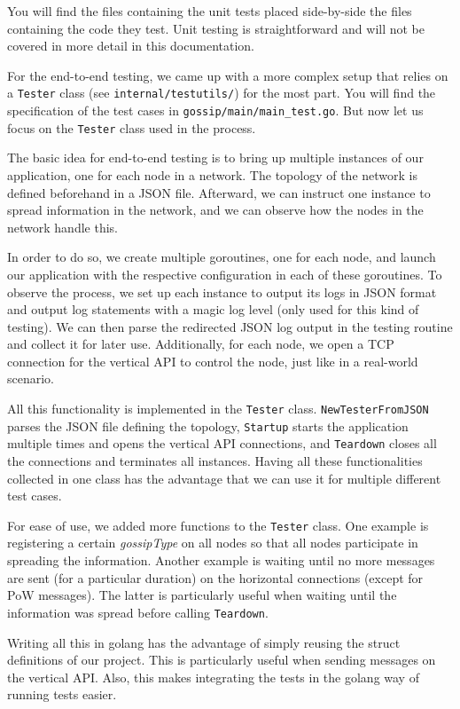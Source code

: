 \documentclass[a4paper,english,10pt,NET]{tumarticle}
\begin{document}
You will find the files containing the unit tests placed side-by-side the files containing the code they test.
Unit testing is straightforward and will not be covered in more detail in this documentation.

For the end-to-end testing, we came up with a more complex setup that relies on a \texttt{Tester} class (see \texttt{internal/testutils/}) for the most part.
You will find the specification of the test cases in \texttt{gossip/main/main\_test.go}.
But now let us focus on the \texttt{Tester} class used in the process.

The basic idea for end-to-end testing is to bring up multiple instances of our application, one for each node in a network.
The topology of the network is defined beforehand in a JSON file.
Afterward, we can instruct one instance to spread information in the network, and we can observe how the nodes in the network handle this.

In order to do so, we create multiple goroutines, one for each node, and launch our application with the respective configuration in each of these goroutines.
To observe the process, we set up each instance to output its logs in JSON format and output log statements with a magic log level (only used for this kind of testing).
We can then parse the redirected JSON log output in the testing routine and collect it for later use.
Additionally, for each node, we open a TCP connection for the vertical API to control the node, just like in a real-world scenario.

All this functionality is implemented in the \texttt{Tester} class.
\texttt{NewTesterFromJSON} parses the JSON file defining the topology,
\texttt{Startup} starts the application multiple times and opens the vertical API connections, and
\texttt{Teardown} closes all the connections and terminates all instances.
Having all these functionalities collected in one class has the advantage that we can use it for multiple different test cases.

For ease of use, we added more functions to the \texttt{Tester} class.
One example is registering a certain \emph{gossipType} on all nodes so that all nodes participate in spreading the information.
Another example is waiting until no more messages are sent (for a particular duration) on the horizontal connections (except for PoW messages).
The latter is particularly useful when waiting until the information was spread before calling \texttt{Teardown}.

Writing all this in golang has the advantage of simply reusing the struct definitions of our project.
This is particularly useful when sending messages on the vertical API.
Also, this makes integrating the tests in the golang way of running tests easier.
\end{document}
